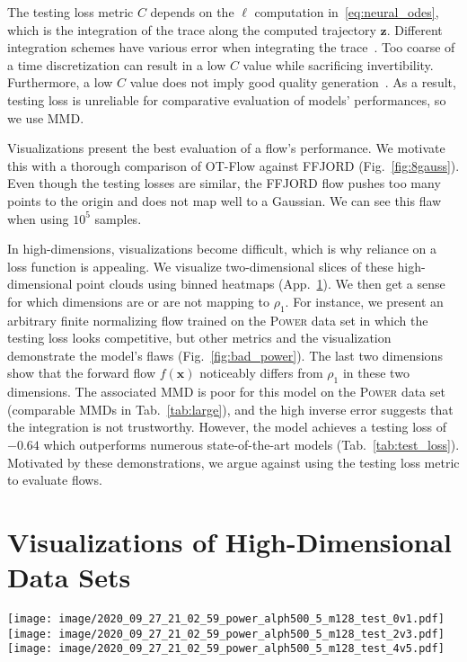 \documentclass[letterpaper]{article}
\newcommand{\power}{\textsc{Power}}
\newcommand{\bfx}{\boldsymbol{x}}
\newcommand{\bfz}{\boldsymbol{z}}
\newcommand{\model}{OT-Flow} %
\begin{document}
	The testing loss metric $C$ depends on the $\ell$ computation in~\eqref{eq:neural_odes}, which is the integration of the trace along the computed trajectory $\bfz$. 
	Different integration schemes have various error when integrating the trace~\cite{wehenkel2019unconstrained,onken2020do}. Too coarse of a time discretization can result in a low $C$ value while sacrificing invertibility. Furthermore, a low $C$ value does not imply good quality generation~\cite{theis2016mmd}.
	As a result, testing loss is unreliable for comparative evaluation of models' performances, so we use MMD.
	
	Visualizations present the best evaluation of a flow's performance. We motivate this with a thorough comparison of \model{} against FFJORD (Fig.~\ref{fig:8gauss}). Even though the testing losses are similar, the FFJORD flow pushes too many points to the origin and does not map well to a Gaussian. We can see this flaw when using $10^5$ samples.
		
	In high-dimensions, visualizations become difficult, which is why reliance on a loss function is appealing. We visualize two-dimensional slices of these high-dimensional point clouds using binned heatmaps (App.~\ref{app:extra_figs}). We then get a sense for which dimensions are or are not mapping to $\rho_1$. For instance, we present an arbitrary finite normalizing flow trained on the \power{} data set in which the testing loss looks competitive, but other metrics and the visualization demonstrate the model's flaws (Fig.~\ref{fig:bad_power}). The last two dimensions show that the forward flow $f(\bfx)$ noticeably differs from $\rho_1$ in these two dimensions. The associated MMD is poor for this model on the \power{} data set (comparable MMDs in Tab.~\ref{tab:large}), and the high inverse error suggests that the integration is not trustworthy. However, the model achieves a testing loss of $-0.64$ which outperforms numerous state-of-the-art models (Tab.~\ref{tab:test_loss}). Motivated by these demonstrations, we argue against using the testing loss metric to evaluate flows.




\section{Visualizations of High-Dimensional Data Sets} \label{app:extra_figs}

 \begin{figure*}[h]
     \centering
      \texttt{[image: image/2020\_09\_27\_21\_02\_59\_power\_alph500\_5\_m128\_test\_0v1.pdf]}
      \texttt{[image: image/2020\_09\_27\_21\_02\_59\_power\_alph500\_5\_m128\_test\_2v3.pdf]} \\
      \texttt{[image: image/2020\_09\_27\_21\_02\_59\_power\_alph500\_5\_m128\_test\_4v5.pdf]}
     \caption{Model performance on \power{} test data.}
     \label{fig:power}
 \end{figure*}     
\end{document}
